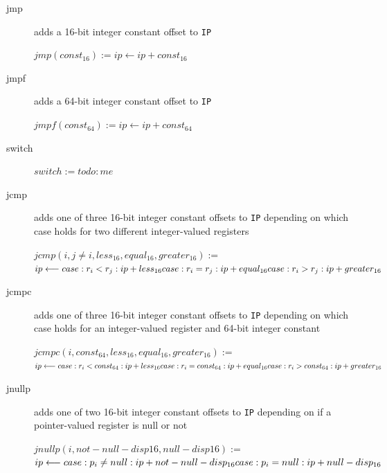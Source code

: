 \documentclass[english,a4paper]{article}
\begin{document}
\begin{description}
\item[jmp] adds a 16-bit integer constant offset to \verb|IP|
    
  $jmp(const_{16}) := ip \longleftarrow ip + const_{16}$ \\
\item[jmpf] adds a 64-bit integer constant offset to \verb|IP|

  $jmpf(const_{64}) := ip \longleftarrow ip + const_{64}$ \\
\item[switch]

  $switch := todo: me$ \\
\item[jcmp] adds one of three 16-bit integer constant offsets to
  \verb|IP| depending on which case holds for two different
  integer-valued registers

  $jcmp(i, j\neq i,less_{16},equal_{16},greater_{16}) :=$ \\
  $ ip \longleftarrow  \\
  case :r_{i} < r_{j}: ip + less_{16}   \\
  case :r_{i} = r_{j}: ip + equal_{16} \\
  case :r_{i} > r_{j}: ip + greater_{16}$ \\
\item[jcmpc] adds one of three 16-bit integer constant offsets to
  \verb|IP| depending on which case holds for an integer-valued
  register and 64-bit integer constant
 
  $jcmpc (i, const_{64},less_{16},equal_{16},greater_{16}) :=$ \\
  $ ip \longleftarrow  \\
  case: r_{i} < const_{64}: ip + less_{16}   \\
  case: r_{i} = const_{64}: ip + equal_{16} \\
  case: r_{i} > const_{64}: ip + greater_{16}$
\item[jnullp] adds one of two 16-bit integer constant offsets to
  \verb|IP| depending on if a pointer-valued register is null or not

  $jnullp(i,not-null-disp16,null-disp16) :=$ \\
  $ip \longleftarrow \\
  case: p_{i} \neq null: ip + not-null-disp_{16} \\
  case: p_{i} = null: ip + null-disp_{16}$ \\
\end{description}
\end{document}
